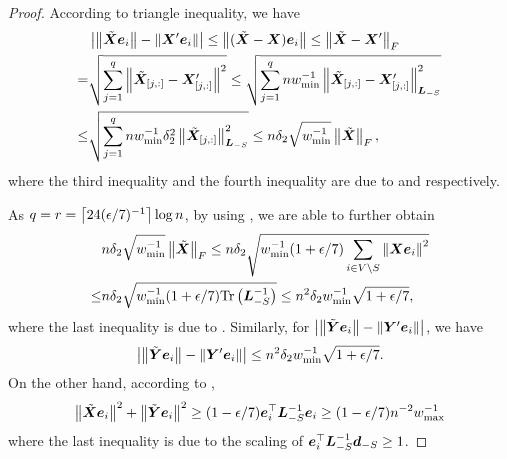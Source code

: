 \documentclass[sigconf]{acmart}
\begin{document}
\begin{proof}
  According to triangle inequality, we have
  \begin{align*}
        & \left|\left\Vert\tilde{\boldsymbol{X}}\boldsymbol{e}_i\right\Vert-\left\Vert\boldsymbol{X}'\boldsymbol{e}_i\right\Vert \right|\le\left\Vert(\tilde{\boldsymbol{X}}-\boldsymbol{X})\boldsymbol{e}_i\right\Vert\le\left\Vert\tilde{\boldsymbol{X}}-\boldsymbol{X}'\right\Vert_{F}                                  \\
    =   & \sqrt{\sum_{j=1}^q\left\Vert\tilde{\boldsymbol{X}}_{[j,:]}-\boldsymbol{X}'_{[j,:]}\right\Vert^2}\le\sqrt{\sum_{j=1}^qnw_{\min}^{-1}\left\Vert\tilde{\boldsymbol{X}}_{[j,:]}-\boldsymbol{X}'_{[j,:]}\right\Vert_{\boldsymbol{L}_{-S}}^2} \\
    \le & \sqrt{\sum_{j=1}^qnw_{\min}^{-1}\delta_2^2\left\Vert\tilde{\boldsymbol{X}}_{[j,:]}\right\Vert_{\boldsymbol{L}_{-S}}^2}\le n\delta_2\sqrt{w_{\min}^{-1}}\left\Vert\tilde{\boldsymbol{X}}\right\Vert_F,
  \end{align*}
  where the third inequality and the fourth inequality are due to  and  respectively.

  As \(q=r=\left\lceil24(\epsilon/7)^{-1}\right\rceil\log n\), by using , we are able to further obtain
  \begin{align*}
        & n\delta_2\sqrt{w_{\min}^{-1}}\left\Vert\tilde{\boldsymbol{X}}\right\Vert_F\le n\delta_2\sqrt{w_{\min}^{-1}(1+\epsilon/7)\sum_{i\in V\setminus S}\left\Vert\boldsymbol{X}\boldsymbol{e}_i\right\Vert^2} \\
    \le & n\delta_2\sqrt{w_{\min}^{-1}(1+\epsilon/7)\mathrm{Tr}\left(\boldsymbol{L}_{-S}^{-1}\right)}\le n^2\delta_2w_{\min}^{-1}\sqrt{1+\epsilon/7},
  \end{align*}
  where the last inequality is due to .
  Similarly, for \(\left|\left\Vert\tilde{\boldsymbol{Y}}\boldsymbol{e}_i\right\Vert-\left\Vert\boldsymbol{Y}'\boldsymbol{e}_i\right\Vert \right|\), we have
  \begin{equation}\label{eq:approx-maty-raw}
    \left|\left\Vert\tilde{\boldsymbol{Y}}\boldsymbol{e}_i\right\Vert-\left\Vert\boldsymbol{Y}'\boldsymbol{e}_i\right\Vert \right|\le n^2\delta_2w_{\min}^{-1}\sqrt{1+\epsilon/7}.
  \end{equation}
  On the other hand, according to ,
  \[\left\Vert\tilde{\boldsymbol{X}}\boldsymbol{e}_i\right\Vert^2+\left\Vert\tilde{\boldsymbol{Y}}\boldsymbol{e}_i\right\Vert^2\ge(1-\epsilon/7)\boldsymbol{e}_i^\top\boldsymbol{L}_{-S}^{-1}\boldsymbol{e}_i\ge(1-\epsilon/7)n^{-2}w_{\max}^{-1}\]
  where the last inequality is due to the scaling of \(\boldsymbol{e}_i^\top\boldsymbol{L}_{-S}^{-1}\boldsymbol{d}_{-S}\ge1\).


\end{proof}
\end{document}

